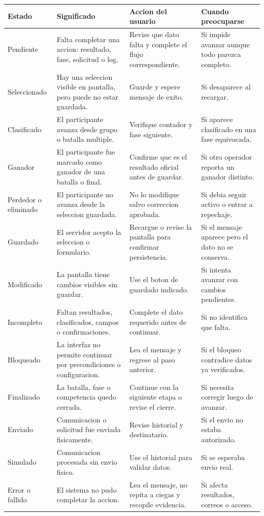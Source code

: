 \begin{longtable}{p{2.4cm}p{4.1cm}p{4.0cm}p{2.8cm}}
\toprule
Estado & Significado & Accion del usuario & Cuando preocuparse\\
\midrule
\endhead
Pendiente & Falta completar una accion: resultado, fase, solicitud o log. & Revise que dato falta y complete el flujo correspondiente. & Si impide avanzar aunque todo parezca completo.\\
Seleccionado & Hay una seleccion visible en pantalla, pero puede no estar guardada. & Guarde y espere mensaje de exito. & Si desaparece al recargar.\\
Clasificado & El participante avanza desde grupo o batalla multiple. & Verifique contador y fase siguiente. & Si aparece clasificado en una fase equivocada.\\
Ganador & El participante fue marcado como ganador de una batalla o final. & Confirme que es el resultado oficial antes de guardar. & Si otro operador reporta un ganador distinto.\\
Perdedor o eliminado & El participante no avanza desde la seleccion guardada. & No lo modifique salvo correccion aprobada. & Si debia seguir activo o entrar a repechaje.\\
Guardado & El servidor acepto la seleccion o formulario. & Recargue o revise la pantalla para confirmar persistencia. & Si el mensaje aparece pero el dato no se conserva.\\
Modificado & La pantalla tiene cambios visibles sin guardar. & Use el boton de guardado indicado. & Si intenta avanzar con cambios pendientes.\\
Incompleto & Faltan resultados, clasificados, campos o confirmaciones. & Complete el dato requerido antes de continuar. & Si no identifica que falta.\\
Bloqueado & La interfaz no permite continuar por precondiciones o configuracion. & Lea el mensaje y regrese al paso anterior. & Si el bloqueo contradice datos ya verificados.\\
Finalizado & La batalla, fase o competencia quedo cerrada. & Continue con la siguiente etapa o revise el cierre. & Si necesita corregir luego de avanzar.\\
Enviado & Comunicacion o solicitud fue enviada fisicamente. & Revise historial y destinatario. & Si el envio no estaba autorizado.\\
Simulado & Comunicacion procesada sin envio fisico. & Use el historial para validar datos. & Si se esperaba envio real.\\
Error o fallido & El sistema no pudo completar la accion. & Lea el mensaje, no repita a ciegas y recopile evidencia. & Si afecta resultados, correos o acceso.\\
\bottomrule
\end{longtable}


